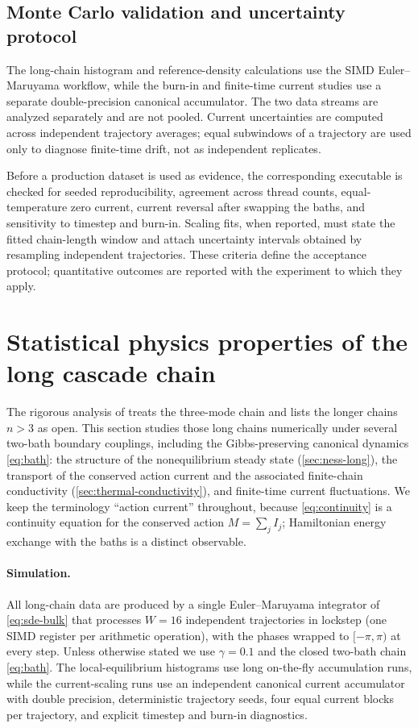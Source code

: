 \documentclass[11pt,a4paper]{article}
\theoremstyle{definition}
\numberwithin{equation}{section}   %
\begin{document}
\subsection{Monte Carlo validation and uncertainty protocol}\label{sec:mc-validation}

The long-chain histogram and reference-density calculations use the SIMD
Euler--Maruyama workflow, while the burn-in and finite-time current studies use
a separate double-precision canonical accumulator. The two
data streams are analyzed separately and are not pooled. Current uncertainties
are computed across independent trajectory averages; equal subwindows of a
trajectory are used only to diagnose finite-time drift, not as independent
replicates.

Before a production dataset is used as evidence, the corresponding executable
is checked for seeded reproducibility, agreement across thread counts,
equal-temperature zero current, current reversal after swapping the baths, and
sensitivity to timestep and burn-in. Scaling fits, when reported, must state
the fitted chain-length window and attach uncertainty intervals obtained by
resampling independent trajectories. These criteria define the acceptance
protocol; quantitative outcomes are reported with the experiment to which they
apply.

\section{Statistical physics properties of the long cascade chain}\label{sec:long-chain}

The rigorous analysis of \cite{HLNS} treats the three-mode chain and lists the
longer chains $n>3$ as open. This section studies those long chains
numerically under several two-bath boundary couplings, including the
Gibbs-preserving canonical dynamics \eqref{eq:bath}: the structure of the
nonequilibrium steady state (\cref{sec:ness-long}), the
transport of the conserved action current and the associated finite-chain
conductivity (\cref{sec:thermal-conductivity}), and finite-time current
fluctuations. We keep the terminology ``action current'' throughout, because
\eqref{eq:continuity} is a continuity equation for the conserved action
$M=\sum_j I_j$; Hamiltonian energy exchange with the baths is a distinct
observable.

\paragraph{Simulation.}
All long-chain data are produced by a single Euler--Maruyama integrator of
\eqref{eq:sde-bulk} that processes $W=16$ independent trajectories in lockstep
(one SIMD register per arithmetic operation), with the phases wrapped to
$[-\pi,\pi)$ at every step. Unless otherwise stated we use $\gamma=0.1$ and the
closed two-bath chain \eqref{eq:bath}. The local-equilibrium histograms use
long on-the-fly accumulation runs, while the current-scaling runs use an
independent canonical current accumulator with double precision, deterministic
trajectory seeds, four equal current blocks per trajectory, and explicit
timestep and burn-in diagnostics.
\end{document}

